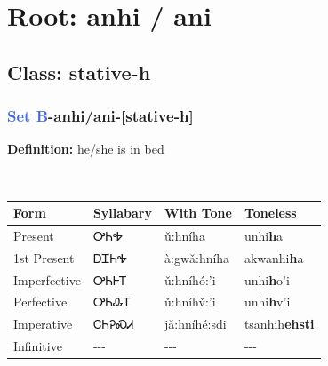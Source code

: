 \needspace{4in}
\section*{Root: anhi / ani}
\nopagebreak
{}
\needspace{3in}
\subsection*{Class: stative-h}
\nopagebreak
\needspace{2in}
\subsubsection*{\textcolor{RoyalBlue}{Set B}{-}\textbf{anhi/ani}{-}[stative-h]}
\nopagebreak
\textbf{Definition: } he/she is in bed
\\[0.5em]
\begin{tabularx}{\textwidth}{l X X X}%
\toprule%
\textbf{Form}&\textbf{Syllabary}&\textbf{With Tone}&\textbf{Toneless}\\%
\midrule%
Present&ᎤᏂᎭ&ǔ:hníha&unhi\textbf{h}a\\%
1st Present&ᎠᏆᏂᎭ&à:gwǎ:hníha&akwanhi\textbf{h}a\\%
Imperfective&ᎤᏂᎰᎢ&ǔ:hníhó:’i&unhi\textbf{h}o'i\\%
Perfective&ᎤᏂᎲᎢ&ǔ:hníhv̌:’i&unhi\textbf{h}v'i\\%
Imperative&ᏣᏂᎮᏍᏗ&jǎ:hníhé:sdi&tsanhih\textbf{ehsti}\\%
Infinitive&{-}{-}{-}&{-}{-}{-}&{-}{-}{-}\\%
\bottomrule%
\end{tabularx}
\\[1em]